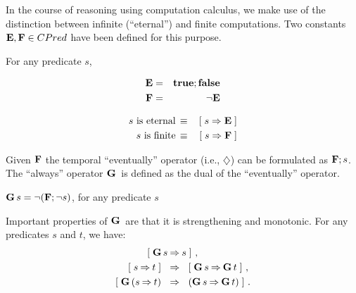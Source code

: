 In the course of reasoning using computation calculus, we make use of
the distinction between infinite (``eternal'') and finite
computations.  Two constants $\mathbf{E}, \mathbf{F} \in CPred$ have been defined for
this purpose. 
\begin{Definition} For any predicate $s$,\\[-2ex]
  \begin{minipage}{0.4\linewidth}
    \begin{eqnarray}
      \mathbf{E} & = & \mathbf{true};\mathbf{false} \label{eq:comp-eternal} \\
      \mathbf{F} & = & \neg \mathbf{E} \label{eq:comp-finite}
    \end{eqnarray}
  \end{minipage}
  \hfill
  \begin{minipage}{0.4\linewidth}
    \begin{eqnarray}
      \textrm{$s$ is eternal} & \, \equiv \, & [\; s \Rightarrow \mathbf{E} \;] \label{eq:comp-s-eternal} \\
      \textrm{$s$ is finite} & \, \equiv\, & [\; s \Rightarrow \mathbf{F} \;] \label{eq:comp-s-finite}
    \end{eqnarray}
  \end{minipage}
\end{Definition}
Given $\mathbf{F}$ the temporal ``eventually'' operator (i.e., $\diamondsuit$)
can be formulated as $\mathbf{F};s$.  The ``always'' operator $\mathbf{G}\,$ is defined
as the dual of the ``eventually'' operator.
\begin{Definition}
  $\mathbf{G}\, s = \neg(\mathbf{F};\neg s)$, for any predicate $s$
\end{Definition}
Important properties of $\mathbf{G}\,$ are that it is strengthening and
monotonic.  For any predicates $s$ and $t$, we have: 
\begin{align}
  \label{eq:g-strengthen}
  \ew{\G s &\limp s}~, \\
  \label{eq:g-monotonic}
  \ew{s \limp t} \Wide{&\limp} \ew{\G s \limp \G t}~, \\ 
  \ew{ \G (s \limp t) \Wide{&\limp} (\G s \limp \G t) }~.
\end{align}


